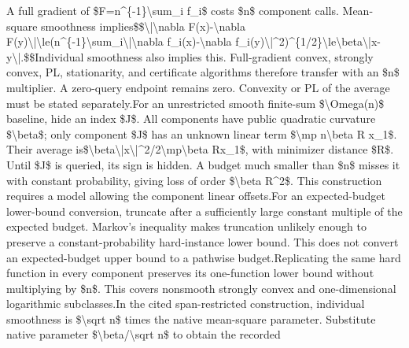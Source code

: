 \documentclass[10pt,a4paper]{article}
\begin{document}
\begingroup\raggedright\sloppy A full gradient of \$F=\allowbreak{}n\textasciicircum{}\{-1\}\textbackslash{}sum\_\allowbreak{}i f\_\allowbreak{}i\$ costs \$n\$ component calls. Mean-square smoothness implies\newline{}\$\$\newline{}\textbackslash{}|\textbackslash{}nabla F(x)-\textbackslash{}nabla F(y)\textbackslash{}|\newline{}\textbackslash{}le(n\textasciicircum{}\{-1\}\textbackslash{}sum\_\allowbreak{}i\textbackslash{}|\textbackslash{}nabla f\_\allowbreak{}i(x)-\textbackslash{}nabla f\_\allowbreak{}i(y)\textbackslash{}|\textasciicircum{}2)\textasciicircum{}\{1/\allowbreak{}2\}\newline{}\textbackslash{}le\textbackslash{}beta\textbackslash{}|x-y\textbackslash{}|.\newline{}\$\$\newline{}Individual smoothness also implies this. Full-gradient convex,\allowbreak{} strongly convex,\allowbreak{} PL,\allowbreak{} stationarity,\allowbreak{} and certificate algorithms therefore transfer with an \$n\$ multiplier. A zero-query endpoint remains zero. Convexity or PL of the average must be stated separately.\newline{}\newline{}For an unrestricted smooth finite-sum \$\textbackslash{}Omega(n)\$ baseline,\allowbreak{} hide an index \$J\$. All components have public quadratic curvature \$\textbackslash{}beta\$;\allowbreak{} only component \$J\$ has an unknown linear term \$\textbackslash{}mp n\textbackslash{}beta R x\_\allowbreak{}1\$. Their average is\newline{}\$\textbackslash{}beta\textbackslash{}|x\textbackslash{}|\textasciicircum{}2/\allowbreak{}2\textbackslash{}mp\textbackslash{}beta Rx\_\allowbreak{}1\$,\allowbreak{} with minimizer distance \$R\$. Until \$J\$ is queried,\allowbreak{} its sign is hidden. A budget much smaller than \$n\$ misses it with constant probability,\allowbreak{} giving loss of order \$\textbackslash{}beta R\textasciicircum{}2\$. This construction requires a model allowing the component linear offsets.\newline{}\newline{}For an expected-budget lower-bound conversion,\allowbreak{} truncate after a sufficiently large constant multiple of the expected budget. Markov's inequality makes truncation unlikely enough to preserve a constant-probability hard-instance lower bound. This does not convert an expected-budget upper bound to a pathwise budget.\newline{}\newline{}Replicating the same hard function in every component preserves its one-function lower bound without multiplying by \$n\$. This covers nonsmooth strongly convex and one-dimensional logarithmic subclasses.\newline{}\newline{}In the cited span-restricted construction,\allowbreak{} individual smoothness is \$\textbackslash{}sqrt n\$ times the native mean-square parameter. Substitute native parameter \$\textbackslash{}beta/\allowbreak{}\textbackslash{}sqrt n\$ to obtain the recorded 
\end{document}
